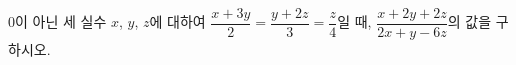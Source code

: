 $0$이 아닌 세 실수 $x$, $y$, $z$에 대하여 $\dfrac{x+3y}{2}=\dfrac{y+2z}{3}=\dfrac{z}{4}$일 때, $\dfrac{x+2y+2z}{2x+y-6z}$의 값을 구하시오.
